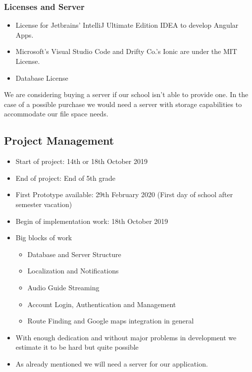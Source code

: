 \documentclass[12pt]{article}
\theoremstyle{definition}
\begin{document}
\subsubsection{Licenses and Server}
\begin{itemize}
\item License for Jetbrains' IntelliJ Ultimate Edition IDEA to develop Angular Apps.
\item Microsoft's Visual Studio Code and Drifty Co.'s Ionic are under the MIT License.
\item Database License
\end{itemize}

We are considering buying a server if our school isn't able to provide one. In the case of a possible purchase we would need a server with storage capabilities to accommodate our file space needs.

\subsection{Project Management}
\begin{itemize}
    \item Start of project: 14th or 18th October 2019
    \item End of project: End of 5th grade
    \item First Prototype available: 29th February 2020 (First day of school after semester vacation)
    \item Begin of implementation work: 18th October 2019
    \item Big blocks of work
    \begin{itemize}
        \item Database and Server Structure
        \item Localization and Notifications
        \item Audio Guide Streaming
        \item Account Login, Authentication and Management
        \item Route Finding and Google maps integration in general
    \end{itemize}
    \item With enough dedication and without major problems in development we estimate it to be hard but quite possible
    \item As already mentioned we will need a server for our application.
    
\end{itemize} 
\end{document}
